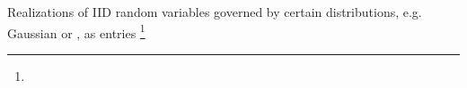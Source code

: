 Realizations of
\ac{IID} random variables governed by
certain distributions, e.g.
Gaussian or
, as
entries
\cite[Thm. 5.2]{article:BaraniukCA2008}%
\footnote{
}
